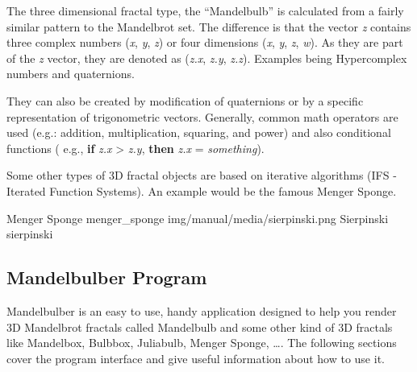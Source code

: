 The three dimensional fractal type, the ``Mandelbulb'' is calculated from a
fairly similar pattern to the Mandelbrot set. The difference is that the vector
\emph{z} contains three complex numbers (\emph{x}, \emph{y}, \emph{z}) or four
dimensions (\emph{x}, \emph{y}, \emph{z}, \emph{w}). As they are part of the
\emph{z} vector, they are denoted as (\emph{z.x}, \emph{z.y}, \emph{z.z}).
Examples being Hypercomplex numbers and quaternions.

They can also be created by modification of quaternions or by a specific
representation of trigonometric vectors. Generally, common math operators are
used (e.g.: addition, multiplication, squaring, and power) and also
conditional functions ( e.g., \textbf{if} \emph{z.x} \textgreater{} \emph{z.y},
\textbf{then} \emph{z.x} = \emph{something}).

Some other types of 3D fractal objects are based on iterative algorithms (IFS -
Iterated Function Systems). An example would be the famous Menger Sponge.
\nopagebreak

	{Menger Sponge}
	{menger_sponge}
	{img/manual/media/sierpinski.png}
	{Sierpinski}
	{sierpinski}

\subsection{Mandelbulber Program}\label{mandelbulber-program}

Mandelbulber is an easy to use, handy application designed to help you render 3D
Mandelbrot fractals called Mandelbulb and some other kind of 3D fractals like
Mandelbox, Bulbbox, Juliabulb, Menger Sponge, \ldots{}. The following sections
cover the program interface and give useful information about how to use it.
